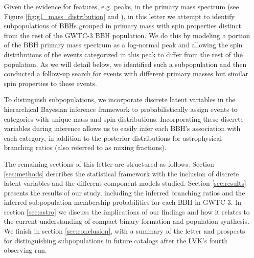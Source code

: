Given the evidence for features, e.g. peaks, in the primary mass spectrum (see Figure \ref{fig:g1_mass_distribution} and \citet{2021arXiv211103634T, 2022ApJ...928..155T, 10.3847/2041-8213/aa9bf6, 10.3847/1538-4357/aab34c, 2019ApJ...882L..24A, 2021ApJ...913L...7A}), in this letter we attempt to identify subpopulations of BBHs grouped in primary mass with spin properties distinct from the rest of the GWTC-3 BBH population. We do this by modeling a portion of the BBH primary mass spectrum as a log-normal peak and allowing the spin distributions of the events categorized in this peak to differ from the rest of the population. As we will detail below, we identified such a subpopulation and then conducted a follow-up search for events with different primary masses but similar spin properties to these events.

To distinguish subpopulations, we incorporate discrete latent variables in the hierarchical Bayesian inference framework to probabilistically assign events to categories with unique mass and spin distributions. Incorporating these discrete variables during inference allows us to easily infer each BBH's association with each category, in addition to the posterior distributions for astrophysical branching ratios (also referred to as mixing fractions). 

The remaining sections of this letter are structured as follows: Section \ref{sec:methods} describes the statistical framework with the inclusion of discrete latent variables and the different component models studied. Section \ref{sec:results} presents the results of our study, including the inferred branching ratios and the inferred subpopulation membership probabilities for each BBH in GWTC-3. In section \ref{sec:astro} we discuss the implications of our findings and how it relates to the current understanding of compact binary formation and population synthesis. We finish in section \ref{sec:conclusion}, with a summary of the letter and prospects for distinguishing subpopulations in future catalogs after the LVK's fourth observing run.